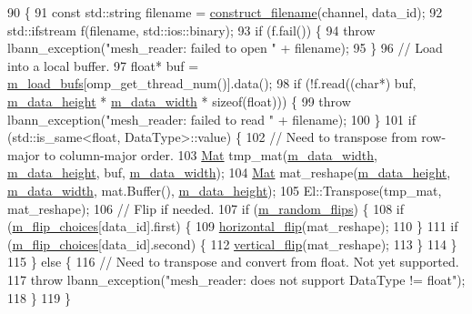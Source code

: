 \begin{DoxyCode}
90                                                                           \{
91   \textcolor{keyword}{const} std::string filename = \hyperlink{classlbann_1_1mesh__reader_a61fd5f3231815ec79eb3cf17070509f9}{construct\_filename}(channel, data\_id);
92   std::ifstream f(filename, std::ios::binary);
93   \textcolor{keywordflow}{if} (f.fail()) \{
94     \textcolor{keywordflow}{throw} lbann\_exception(\textcolor{stringliteral}{"mesh\_reader: failed to open "} + filename);
95   \}
96   \textcolor{comment}{// Load into a local buffer.}
97   \textcolor{keywordtype}{float}* buf = \hyperlink{classlbann_1_1mesh__reader_a43bcee9494e51c397af690eb0291b168}{m\_load\_bufs}[omp\_get\_thread\_num()].data();
98   \textcolor{keywordflow}{if} (!f.read((\textcolor{keywordtype}{char}*) buf, \hyperlink{classlbann_1_1mesh__reader_aeb4e0df4e0be56244df5b663e2940d11}{m\_data\_height} * \hyperlink{classlbann_1_1mesh__reader_a8e16a565b0afd3097a0b6fe31a94641e}{m\_data\_width} * \textcolor{keyword}{sizeof}(\textcolor{keywordtype}{float}))) \{
99     \textcolor{keywordflow}{throw} lbann\_exception(\textcolor{stringliteral}{"mesh\_reader: failed to read "} + filename);
100   \}
101   \textcolor{keywordflow}{if} (std::is\_same<float, DataType>::value) \{
102     \textcolor{comment}{// Need to transpose from row-major to column-major order.}
103     \hyperlink{base_8hpp_a68f11fdc31b62516cb310831bbe54d73}{Mat} tmp\_mat(\hyperlink{classlbann_1_1mesh__reader_a8e16a565b0afd3097a0b6fe31a94641e}{m\_data\_width}, \hyperlink{classlbann_1_1mesh__reader_aeb4e0df4e0be56244df5b663e2940d11}{m\_data\_height}, buf, 
      \hyperlink{classlbann_1_1mesh__reader_a8e16a565b0afd3097a0b6fe31a94641e}{m\_data\_width});
104     \hyperlink{base_8hpp_a68f11fdc31b62516cb310831bbe54d73}{Mat} mat\_reshape(\hyperlink{classlbann_1_1mesh__reader_aeb4e0df4e0be56244df5b663e2940d11}{m\_data\_height}, \hyperlink{classlbann_1_1mesh__reader_a8e16a565b0afd3097a0b6fe31a94641e}{m\_data\_width}, mat.Buffer(), 
      \hyperlink{classlbann_1_1mesh__reader_aeb4e0df4e0be56244df5b663e2940d11}{m\_data\_height});
105     El::Transpose(tmp\_mat, mat\_reshape);
106     \textcolor{comment}{// Flip if needed.}
107     \textcolor{keywordflow}{if} (\hyperlink{classlbann_1_1mesh__reader_a0be20898f9c5d9b195587fb5fafc5d5a}{m\_random\_flips}) \{
108       \textcolor{keywordflow}{if} (\hyperlink{classlbann_1_1mesh__reader_aa9301a3dcaf08c03298f696e1430e67a}{m\_flip\_choices}[data\_id].first) \{
109         \hyperlink{classlbann_1_1mesh__reader_a8cff71603c2d652f8b000a5dc4c75431}{horizontal\_flip}(mat\_reshape);
110       \}
111       \textcolor{keywordflow}{if} (\hyperlink{classlbann_1_1mesh__reader_aa9301a3dcaf08c03298f696e1430e67a}{m\_flip\_choices}[data\_id].second) \{
112         \hyperlink{classlbann_1_1mesh__reader_a4b578dc1ba067a07748de0977d97b6bc}{vertical\_flip}(mat\_reshape);
113       \}
114     \}
115   \} \textcolor{keywordflow}{else} \{
116     \textcolor{comment}{// Need to transpose and convert from float. Not yet supported.}
117     \textcolor{keywordflow}{throw} lbann\_exception(\textcolor{stringliteral}{"mesh\_reader: does not support DataType != float"});
118   \}
119 \}
\end{DoxyCode}
